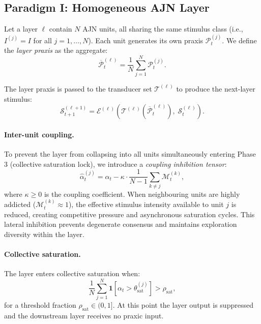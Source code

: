 \documentclass[12pt,a4paper]{article}
\begin{document}
\subsection{Paradigm I: Homogeneous AJN Layer}
\label{sec:homo_layer}

Let a layer $\ell$ contain $N$ AJN units, all sharing the same stimulus class
(i.e., $I^{(j)} = I$ for all $j = 1, \ldots, N$). Each unit generates its own
praxis $\mathcal{P}_t^{(j)}$. We define the \textit{layer praxis} as the
aggregate:
\begin{equation}
\overline{\mathcal{P}}_t^{(\ell)} = \frac{1}{N}\sum_{j=1}^{N} \mathcal{P}_t^{(j)}.
\label{eq:layer_praxis}
\end{equation}

The layer praxis is passed to the transducer set $\mathcal{T}^{(\ell)}$ to produce
the next-layer stimulus:
\begin{equation}
\mathcal{S}_{t+1}^{(\ell+1)} = \mathcal{E}^{(\ell)}\!\left(
\mathcal{T}^{(\ell)}\!\left(\overline{\mathcal{P}}_t^{(\ell)}\right),\;
\mathcal{S}_t^{(\ell)}\right).
\label{eq:layer_stim}
\end{equation}

\paragraph{Inter-unit coupling.}
To prevent the layer from collapsing into all units simultaneously entering Phase 3
(collective saturation lock), we introduce a \textit{coupling inhibition tensor}:
\begin{equation}
\hat{\alpha}_t^{(j)} = \alpha_t - \kappa \cdot \frac{1}{N-1}
\sum_{k \neq j} \mathcal{M}_t^{(k)},
\label{eq:coupling}
\end{equation}
where $\kappa \geq 0$ is the coupling coefficient. When neighbouring units are
highly addicted ($\mathcal{M}_t^{(k)} \approx 1$), the effective stimulus intensity
available to unit $j$ is reduced, creating competitive pressure and asynchronous
saturation cycles. This lateral inhibition prevents degenerate consensus and
maintains exploration diversity within the layer.

\paragraph{Collective saturation.}
The layer enters collective saturation when:
\begin{equation}
\frac{1}{N}\sum_{j=1}^{N} \mathbf{1}\!\left[\alpha_t > \theta_{\text{sat}}^{(j)}\right]
> \rho_{\text{sat}},
\label{eq:coll_sat}
\end{equation}
for a threshold fraction $\rho_{\text{sat}} \in (0,1]$. At this point the layer
output is suppressed and the downstream layer receives no praxic input.
\end{document}
